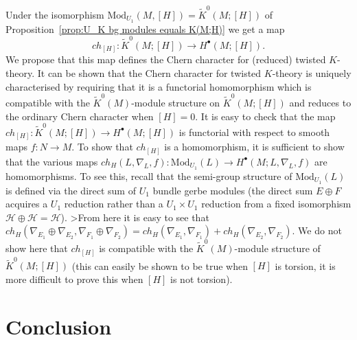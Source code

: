 \documentclass[a4paper,reqno]{amsart}
\theoremstyle{plain}
\theoremstyle{definition}
\theoremstyle{remark}
\numberwithin{equation}{section}
\numberwithin{figure}{section}
\newcommand{\<}{\langle}
\renewcommand{\>}{\rangle}
\begin{document}
Under the isomorphism $\text{Mod}_{U_1}(M,[H]) = 
\tilde{K}^0(M;[H])$ of 
Proposition~\ref{prop:U_K bg modules equals K(M;H)} we 
get a map 
$$
ch_{[H]}\colon \tilde{K}^0(M;[H])\to 
H^\bullet(M;[H]).
$$
We propose that this map 
defines the Chern character for (reduced) twisted 
$K$-theory.  It can be shown that the 
Chern character for twisted $K$-theory 
is uniquely characterised by requiring that 
it is a functorial homomorphism which is compatible 
with the $\tilde{K}^0(M)$-module 
structure on $\tilde{K}^0(M;[H])$ and reduces to 
the ordinary Chern character when $[H] = 0$.  
It is easy to check that the map $ch_{[H]}
\colon \tilde{K}^0(M;[H])\to H^\bullet(M;[H])$   
is functorial with respect to smooth maps 
$f\colon N\to M$.  To show that $ch_{[H]}$ is a 
homomorphism, it is sufficient to show that the various  
maps $ch_H(L,\nabla_L,f)\colon \text{Mod}_{U_1}(L)\to 
H^\bullet(M;L,\nabla_L,f)$ are homomorphisms.  To see this,   
recall that the semi-group 
structure of $\text{Mod}_{U_1}(L)$ 
is defined via the direct sum of $U_1$ bundle gerbe 
modules (the direct sum $E\oplus F$ acquires a 
$U_1$ reduction rather than a $U_1\times U_1$ 
reduction from a fixed isomorphism 
$\mathcal{H}\oplus \mathcal{H} = \mathcal{H}$).  
>From here it is easy to see that $ch_H(\nabla_{E_1} \oplus 
\nabla_{E_2},\nabla_{F_1}\oplus \nabla_{F_2}) = 
ch_H(\nabla_{E_1},\nabla_{F_1}) 
+ ch_H(\nabla_{E_2},\nabla_{F_2})$.  We do not show here 
that $ch_{[H]}$ is compatible with the $\tilde{K}^0(M)$-module 
structure of $\tilde{K}^0(M;[H])$ (this can easily be 
shown to be true when $[H]$ is torsion, it is more 
difficult to prove this when $[H]$ is not torsion).  


\section{Conclusion}
\end{document}
